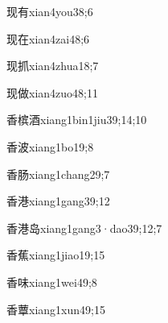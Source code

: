 \begin{verbete}{现有}{xian4you3}{8;6}
\end{verbete}

\begin{verbete}{现在}{xian4zai4}{8;6}
\end{verbete}

\begin{verbete}{现抓}{xian4zhua1}{8;7}
\end{verbete}

\begin{verbete}{现做}{xian4zuo4}{8;11}
\end{verbete}

\begin{verbete}{香槟酒}{xiang1bin1jiu3}{9;14;10}
\end{verbete}

\begin{verbete}{香波}{xiang1bo1}{9;8}
\end{verbete}

\begin{verbete}{香肠}{xiang1chang2}{9;7}
\end{verbete}

\begin{verbete}{香港}{xiang1gang3}{9;12}
\end{verbete}

\begin{verbete}{香港岛}{xiang1gang3·dao3}{9;12;7}
\end{verbete}

\begin{verbete}{香蕉}{xiang1jiao1}{9;15}
\end{verbete}

\begin{verbete}{香味}{xiang1wei4}{9;8}
\end{verbete}

\begin{verbete}{香蕈}{xiang1xun4}{9;15}
\end{verbete}

